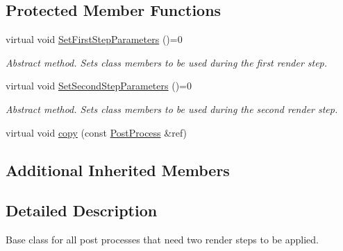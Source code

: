 \subsection*{Protected Member Functions}
\begin{DoxyCompactItemize}
\item 
\mbox{\label{class_geometry_engine_1_1_geometry_post_process_1_1_double_pass_post_process_1_1_double_pass_post_process_ab2decb71497056ed18e207dcbf085037}} 
virtual void \mbox{\hyperlink{class_geometry_engine_1_1_geometry_post_process_1_1_double_pass_post_process_1_1_double_pass_post_process_ab2decb71497056ed18e207dcbf085037}{Set\+First\+Step\+Parameters}} ()=0
\begin{DoxyCompactList}\small\item\em Abstract method. Sets class members to be used during the first render step. \end{DoxyCompactList}\item 
\mbox{\label{class_geometry_engine_1_1_geometry_post_process_1_1_double_pass_post_process_1_1_double_pass_post_process_ac459237c63ed507c1424975f58d5d768}} 
virtual void \mbox{\hyperlink{class_geometry_engine_1_1_geometry_post_process_1_1_double_pass_post_process_1_1_double_pass_post_process_ac459237c63ed507c1424975f58d5d768}{Set\+Second\+Step\+Parameters}} ()=0
\begin{DoxyCompactList}\small\item\em Abstract method. Sets class members to be used during the second render step. \end{DoxyCompactList}\item 
virtual void \mbox{\hyperlink{class_geometry_engine_1_1_geometry_post_process_1_1_double_pass_post_process_1_1_double_pass_post_process_a28b760437951a4676b55efb491358e8f}{copy}} (const \mbox{\hyperlink{class_geometry_engine_1_1_geometry_post_process_1_1_post_process}{Post\+Process}} \&ref)
\end{DoxyCompactItemize}
\subsection*{Additional Inherited Members}


\subsection{Detailed Description}
Base class for all post processes that need two render steps to be applied. 

